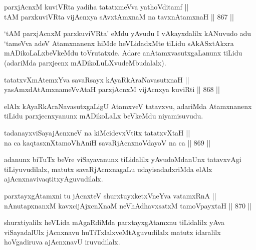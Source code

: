 
\begin{shl}
parxjAcnxM kuviVRta yadiha tatatxmeVva yathoVditamf || \\
tAM parxkuviVRta vijAcnxya sAvxtAmxnaM na tavxnAtamxnaH \hfill || 867 ||  
\end{shl}

\begin{artha}
`tAM parxjAcnxM parxkuviVRta' eMdu yAvudu I vAkayxdalilx kANuvudo adu `tameVva adeV Atamxnanenx hiMde heVLidadxMte tiLidu sAkASxtAkxra mADikoLaLxbeVkeMdu toVrutatxde. Adare anAtamxvasutxgaLanunx tiLidu (adariMda parxjecnx mADikoLuLXvudeMbudalalx).
\end{artha}


\begin{shl}
tatatxvXmAtemxYva savaRsayx kAyaRkAraNavasutxnaH || \\
yasAmxdAtAmxnameVvAtaH parxjAcnxM vijAcnxya kuviRti \hfill || 868 ||  
\end{shl}

\begin{artha}
elAlx kAyaRkAraNavasutxgaLigU AtamxveV tatavxvu, adariMda Atamxnanenx tiLidu parxjecnxyanunx mADikoLaLx beVkeMdu niyamisuvudu.
\end{artha}

\begin{shl}
tadanayxviSayajAcnxneV na kiMcidevxVtitx tatatxvXtaH || \\
na ca kaqtasxnXtamoVhAniH savaRjAcnxnoVdayoV na ca \hfill || 869 ||  
\end{shl}

\begin{artha}
adanunx biTuTx beVre viSayavanunx tiLidalilx yAvudoMdanUnx tatavxvAgi tiLiyuvudilalx, matutx savaRjAcnxnagaLu udayisadadxriMda elAlx ajAcnxnavivaqtitxyAguvudilalx.
\end{artha}


\begin{shl}
parxtayxgAtamxni tu jAcnxteV shurxtuyxketxVneYva vatamxRnA || \\
nAnutapxnanxM kavxcijAjxcnXnaM neVhAdhavxsatxM tamoV\s payxtaH \hfill || 870 ||  
\end{shl}

\begin{artha}
shurxtiyalilx heVLida mAgaRdiMda parxtayxgAtamxnu tiLidalilx yAva viSayadalUlx jAcnxnavu huTiTxlalxveMtAguvudilalx matutx idaralilx hoVgadiruva ajAcnxnavU iruvudilalx.
\end{artha}

